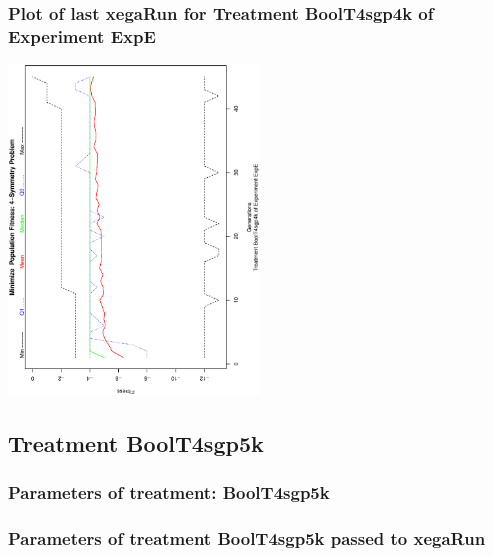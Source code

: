 \documentclass[18pt,c]{beamer}
\makeatletter
\def\beamer@writeslidentry@miniframesoff{%
  \expandafter\beamer@ifempty\expandafter{\beamer@framestartpage}{}%
  {%
   \clearpage\beamer@notesactions%
  }
}
\newcommand*{\miniframesoff}{\let\beamer@writeslidentry=\beamer@writeslidentry@miniframesoff}
\makeatother
\begin{document}
 \begin{frame}
 \frametitle{ Plot of last xegaRun for Treatment BoolT4sgp4k of Experiment ExpE }
 \begin{center}
\includegraphics[width=0.5\textwidth, angle=-90]
{ExpEPlotPopStatsFigure002.eps}
 \end{center}
 \label{report/ExpEPlotPopStatsFigure002.eps}  
 \end{frame}

\miniframesoff
\subsection{Treatment BoolT4sgp5k}

 \begin{frame}
 \fontsize{8pt}{9pt}\selectfont
 \frametitle{  Parameters of treatment: BoolT4sgp5k 
 }

 \label{ExpEtParmTable012.tex}  
 \end{frame}


 \begin{frame}
 \fontsize{8pt}{9pt}\selectfont
 \frametitle{  Parameters of treatment BoolT4sgp5k passed to xegaRun
 }

 \label{ExpEtParmTable013.tex}  
 \end{frame}
\end{document}
